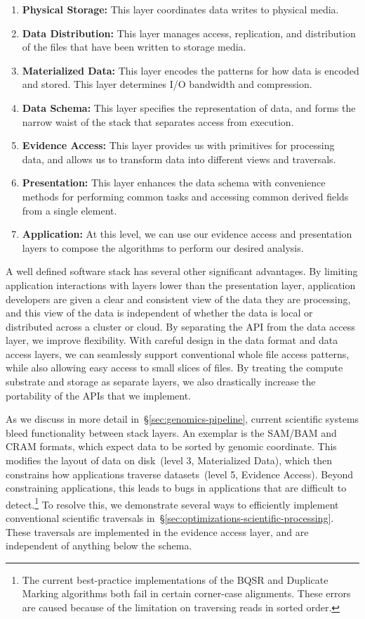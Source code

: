 \documentclass{acm_proc_article-sp}
\begin{document}
\begin{enumerate}
\item {\bf Physical Storage:} This layer coordinates data writes to physical media.
\item {\bf Data Distribution:} This layer manages access, replication, and distribution of the files that have
been written to storage media.
\item {\bf Materialized Data:} This layer encodes the patterns for how data is encoded and stored. This
layer determines I/O bandwidth and compression.
\item {\bf Data Schema:} This layer specifies the representation of data, and forms the narrow waist of
the stack that separates access from execution.
\item {\bf Evidence Access:} This layer provides us with primitives for processing data, and allows us to
transform data into different views and traversals.
\item {\bf Presentation:} This layer enhances the data schema with convenience methods for performing
common tasks and accessing common derived fields from a single element.
\item {\bf Application:} At this level, we can use our evidence access and presentation layers to compose
the algorithms to perform our desired analysis.
\end{enumerate}

A well defined software stack has several other significant advantages. By limiting application
interactions with layers lower than the presentation layer, application developers are given a clear and
consistent view of the data they are processing, and this view of the data is independent of whether the
data is local or distributed across a cluster or cloud. By separating the API from the data access layer,
we improve flexibility. With careful design in the data format and data access layers, we can seamlessly
support conventional whole file access patterns, while also allowing easy access to small slices of files.
By treating the compute substrate and storage as separate layers, we also drastically increase
the portability of the APIs that we implement.

As we discuss in more detail in~\S\ref{sec:genomics-pipeline}, current scientific systems bleed
functionality between stack layers. An exemplar is the SAM/BAM and CRAM formats, which expect data
to be sorted by genomic coordinate. This modifies the layout of data on disk~(level 3, Materialized Data),
which then constrains how applications traverse datasets~(level 5, Evidence Access). Beyond
constraining applications, this leads to bugs in applications that are difficult to detect.\footnote{The
current best-practice implementations of the BQSR and Duplicate Marking algorithms both fail in certain
corner-case alignments. These errors are caused because of the limitation on traversing reads in sorted
order.} To resolve this, we demonstrate several ways to efficiently implement conventional scientific
traversals in~\S\ref{sec:optimizations-scientific-processing}. These traversals are implemented in the
evidence access layer, and are independent of anything below the schema.
\end{document}
